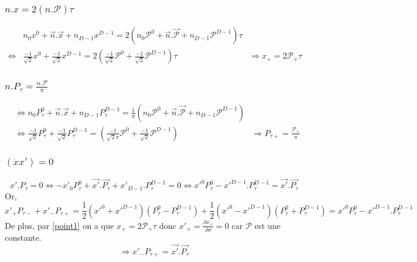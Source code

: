\documentclass[a4paper,12pt]{article}
\begin{document}
\subsubsection{$n.x=2(n.\mathcal{P})\tau$}\label{point1}
\begin{align*}
& n_0x^0 + \vec{n}.\vec{x} + n_{D-1}x^{D-1}=2\left( n_0\mathcal{P}^0 + \vec{n}.\vec{\mathcal{P}} + n_{D-1}\mathcal{P}^{D-1}\right) \tau\\
\Leftrightarrow &\frac{-1}{\sqrt{2}}x^0 + \frac{-1}{\sqrt{2}}x^{D-1}=2\left( \frac{-1}{\sqrt{2}}\mathcal{P}^0  + \frac{-1}{\sqrt{2}}\mathcal{P}^{D-1}\right) \tau &\Rightarrow\boxed{x_+ = 2 \mathcal{P_+}\tau}
\end{align*}
\subsubsection{$n.P_\tau=\frac{n.\mathcal{P}}{\pi}$}
\begin{align*}
&\Leftrightarrow n_0P_\tau^0 + \vec{n}.\vec{x} + n_{D-1}P_\tau^{D-1}=\frac{1}{\pi}\left( n_0\mathcal{P}^0 + \vec{n}.\vec{\mathcal{P}} + n_{D-1}\mathcal{P}^{D-1}\right)\\
&\Leftrightarrow \frac{-1}{\sqrt{2}}P_\tau^0 + \frac{-1}{\sqrt{2}}P_\tau^{D-1}=\left( \frac{-1}{\sqrt{2}\pi}\mathcal{P}^0  + \frac{-1}{\sqrt{2}}\mathcal{P}^{D-1}\right)
&\Rightarrow\boxed{P_{\tau+} = \frac{\mathcal{P_+}}{\pi}}
\end{align*}
\subsubsection{$(\dot{x}x')=0$}
\begin{equation*}
 x'.P_\tau=0
\Leftrightarrow -x'_0P_\tau^0 +\vec{x'}.\vec{P_\tau} + x'_{D-1}.P_\tau^{D-1} =0
\Leftrightarrow x'^0P_\tau^0 - x'^{D-1}.P_\tau^{D-1}=\vec{x'}.\vec{P_\tau}
\end{equation*}
Or,
\begin{equation*}
x'_+P_{\tau -} + x'_-P_{\tau +}=\frac{1}{2}\left( x'^0 + x'^{D-1}\right) \left(P_\tau^0 - P_\tau^{D-1}\right) + \frac{1}{2}\left( x'^0 - x'^{D-1}\right) \left(P_\tau^0 + P_\tau^{D-1}\right)=x'^0P_\tau^0 - x'^{D-1}.P_\tau^{D-1}
\end{equation*}
De plus, par \eqref{point1} on a que $x_+ = 2 \mathcal{P_+}\tau$ donc $x'_+=\frac{\partial x_+}{\partial \sigma}=0$ car $\mathcal{P}$ est une constante.
$$\Rightarrow\boxed{x'_-P_{\tau +}=\vec{x'}.\vec{P_\tau}}$$
\end{document}
